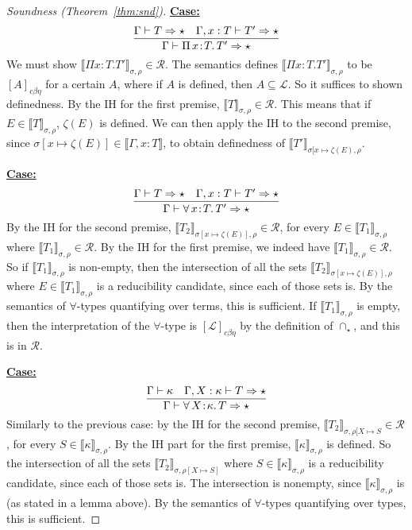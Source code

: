 \documentclass{article}
\newcommand{\choice}[0]{\zeta}
\newcommand{\elcap}[0]{\cap}
\newcommand{\abs}[4]{{#1}\, #2\! : \! #3.\, #4}
\newcommand{\interp}[1]{\llbracket #1 \rrbracket}
\newcommand{\tpsynth}[0]{\Rightarrow}
\newcommand{\cbe}[0]{c\beta\eta}
\newcommand{\startcase}[1]{\vspace{#1} \noindent\textbf{\underline{Case:}}}
\begin{document}
\begin{proof}[Soundness (Theorem~\ref{thm:snd})]
\startcase{.2cm}
\[
   \infer{\Gamma\vdash\abs{\Pi}{x}{T}{T'} \tpsynth \star}{\Gamma \vdash T \tpsynth \star & \Gamma,x:T\vdash T' \tpsynth \star} 
\]
We must show $\interp{\Pi x:T.T'}_{\sigma,\rho}\in\mathcal{R}$. The
semantics defines $\interp{\Pi x:T.T'}_{\sigma,\rho}$ to be
$[A]_{\cbe}$ for a certain $A$, where if $A$ is defined, then
$A\subseteq\mathcal{L}$.  So it suffices to shown definedness. By the IH
for the first premise, $\interp{T}_{\sigma,\rho}\in\mathcal{R}$.  This
means that if $E\in\interp{T}_{\sigma,\rho}$, $\choice(E)$ is defined.
We can then apply the IH to the second premise, since
$\sigma[x\mapsto\choice(E)]\in\interp{\Gamma,x:T}$, to obtain
definedness of $\interp{T'}_{\sigma[x\mapsto\choice(E),\rho}$.


\startcase{.2cm}
\[
   \infer{\Gamma\vdash\abs{\forall}{x}{T}{T'} \tpsynth \star}{\Gamma \vdash T \tpsynth \star & \Gamma,x:T\vdash T' \tpsynth \star} 
\]
By the IH for the second premise, $\interp{T_2}_{\sigma[x\mapsto  \choice(E)],\rho}\in\mathcal{R}$, for every
$E\in\interp{T_1}_{\sigma,\rho}$ where
$\interp{T_1}_{\sigma,\rho}\in\mathcal{R}$.  By the IH for the first
premise, we indeed have $\interp{T_1}_{\sigma,\rho}\in\mathcal{R}$.
So if $\interp{T_1}_{\sigma,\rho}$ is non-empty, then the intersection of all the sets
$\interp{T_2}_{\sigma[x\mapsto \choice(E)],\rho}$ where $E\in\interp{T_1}_{\sigma,\rho}$ is a
reducibility candidate, since each of those sets is.  By the semantics
of $\forall$-types quantifying over terms, this is sufficient.  If $\interp{T_1}_{\sigma,\rho}$ is
empty, then the interpretation of the $\forall$-type is $[\mathcal{L}]_{\cbe}$ by the definition
of $\elcap_\star$, and this is in $\mathcal{R}$.

\startcase{.2cm}
\[
    \infer{\Gamma\vdash \abs{\forall}{X}{\kappa}{T} \tpsynth \star}{\Gamma \vdash \kappa & \Gamma,X:\kappa\vdash T \tpsynth \star} 
\]
Similarly to the previous case: by the IH for the second premise,
$\interp{T_2}_{\sigma,\rho[X\mapsto S}\in\mathcal{R}$, for every
$S\in\interp{\kappa}_{\sigma,\rho}$.  By the IH part for the first
premise, $\interp{\kappa}_{\sigma,\rho}$ is defined.  So the
intersection of all the sets $\interp{T_2}_{\sigma,\rho[X\mapsto S]}$
where $S\in\interp{\kappa}_{\sigma,\rho}$ is a reducibility candidate,
since each of those sets is.  The intersection is nonempty, since $\interp{\kappa}_{\sigma,\rho}$ is (as stated in a lemma above).
By the semantics of $\forall$-types
quantifying over types, this is sufficient. 


\end{proof}
\end{document}
